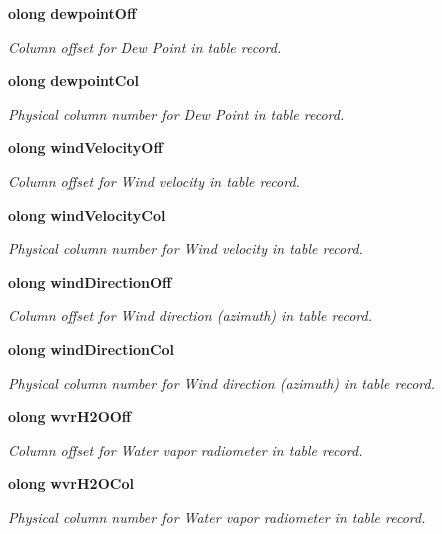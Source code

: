 \begin{CompactItemize}
{\bf olong} {\bf dewpoint\-Off}
\begin{CompactList}\small\item\em Column offset for Dew Point in table record. \item\end{CompactList}\item 
{\bf olong} {\bf dewpoint\-Col}
\begin{CompactList}\small\item\em Physical column number for Dew Point in table record. \item\end{CompactList}\item 
{\bf olong} {\bf wind\-Velocity\-Off}
\begin{CompactList}\small\item\em Column offset for Wind velocity in table record. \item\end{CompactList}\item 
{\bf olong} {\bf wind\-Velocity\-Col}
\begin{CompactList}\small\item\em Physical column number for Wind velocity in table record. \item\end{CompactList}\item 
{\bf olong} {\bf wind\-Direction\-Off}
\begin{CompactList}\small\item\em Column offset for Wind direction (azimuth) in table record. \item\end{CompactList}\item 
{\bf olong} {\bf wind\-Direction\-Col}
\begin{CompactList}\small\item\em Physical column number for Wind direction (azimuth) in table record. \item\end{CompactList}\item 
{\bf olong} {\bf wvr\-H2OOff}
\begin{CompactList}\small\item\em Column offset for Water vapor radiometer in table record. \item\end{CompactList}\item 
{\bf olong} {\bf wvr\-H2OCol}
\begin{CompactList}\small\item\em Physical column number for Water vapor radiometer in table record. \item\end{CompactList}\item 

\end{CompactItemize}
